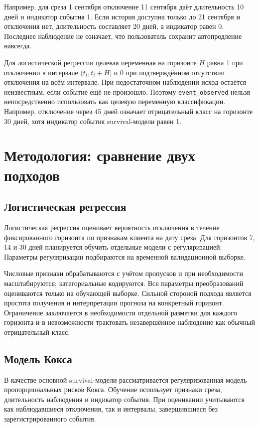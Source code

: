 \documentclass{misisarticle}
\begin{document}
Например, для среза 1 сентября отключение 11 сентября даёт длительность 10 дней и индикатор события 1. Если история доступна только до 21 сентября и отключения нет, длительность составляет 20 дней, а индикатор равен 0. Последнее наблюдение не означает, что пользователь сохранит автопродление навсегда.

Для логистической регрессии целевая переменная на горизонте $H$ равна 1 при отключении в интервале $(t_i,t_i+H]$ и 0 при подтверждённом отсутствии отключения на всём интервале. При недостаточном наблюдении исход остаётся неизвестным, если событие ещё не произошло. Поэтому \texttt{event\_observed} нельзя непосредственно использовать как целевую переменную классификации. Например, отключение через 45 дней означает отрицательный класс на горизонте 30 дней, хотя индикатор события survival-модели равен 1.

\section{Методология: сравнение двух подходов}

\subsection{Логистическая регрессия}

Логистическая регрессия оценивает вероятность отключения в течение фиксированного горизонта по признакам клиента на дату среза. Для горизонтов 7, 14 и 30 дней планируется обучить отдельные модели с регуляризацией. Параметры регуляризации подбираются на временной валидационной выборке.

Числовые признаки обрабатываются с учётом пропусков и при необходимости масштабируются; категориальные кодируются. Все параметры преобразований оцениваются только на обучающей выборке. Сильной стороной подхода является простота получения и интерпретации прогноза на конкретный горизонт. Ограничение заключается в необходимости отдельной разметки для каждого горизонта и в невозможности трактовать незавершённое наблюдение как обычный отрицательный класс.

\subsection{Модель Кокса}

В качестве основной survival-модели рассматривается регуляризованная модель пропорциональных рисков Кокса. Обучение использует признаки среза, длительность наблюдения и индикатор события. При оценивании учитываются как наблюдавшиеся отключения, так и интервалы, завершившиеся без зарегистрированного события.
\end{document}
